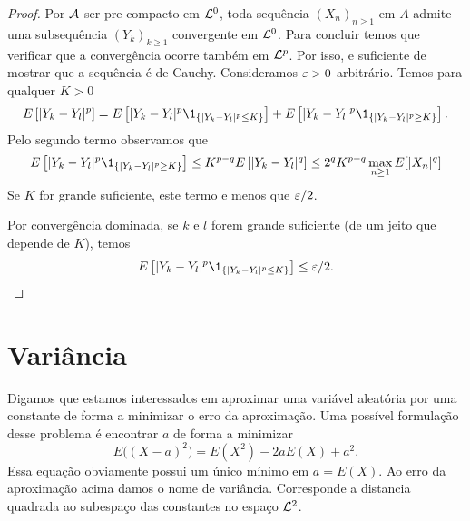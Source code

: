 \begin{topics}
 \begin{proof}
Por ${\mathcal A}$ ser pre-compacto em ${\mathcal L}^0$, toda sequência $(X_n)_{n\ge 1}$ em $A$ admite uma subsequência  $(Y_k)_{k\ge 1}$ convergente em ${\mathcal L}^0$.
Para concluir temos que verificar que a convergência ocorre também em ${\mathcal L}^p$. Por isso, e suficiente de mostrar que a sequência é de Cauchy.
Consideramos $\varepsilon>0$ arbitrário.
Temos para qualquer $K>0$
\begin{equation}
E\left[ |Y_k-Y_l |^p \right] = E\left[ |Y_k-Y_l|^p \1_{\{|Y_k-Y_l |^p \le K\}} \right] +
E\left[ |Y_k-Y_l |^p \1_{\{|Y_k-Y_l |^p \ge K\}} \right].
\end{equation}
 Pelo segundo termo observamos que
 \begin{equation}
 E\left[ |Y_k-Y_l|^p \1_{\{|Y_k-Y_l|^p \ge K\}} \right]\le K^{p-q} E\left[ |Y_k-Y_l|^q \right]\le 2^q K^{p-q} \max_{n\ge 1} E[|X_n|^q]
 \end{equation}
 Se $K$ for grande suficiente, este termo e menos que $\varepsilon/2$.

Por convergência dominada, se $k$ e $l$ forem grande suficiente (de um jeito que depende de $K$), temos
\begin{equation}
 E\left[ |Y_k-Y_l|^p \1_{\{|Y_k-Y_l|^p \le K\}} \right]\le \gep/2.
 \end{equation}

 \end{proof}


\end{topics}







\section{Variância}

Digamos que estamos interessados em aproximar uma variável aleatória por uma constante de forma a minimizar o erro da aproximação.
Uma possível formulação desse problema é encontrar $a$ de forma a minimizar
\begin{equation}
  \label{e:EX_aproxima}
  E\Big( (X - a)^2 \Big) = E(X^2) - 2 a E(X) + a^2.
\end{equation}
Essa equação obviamente possui um único mínimo em $a = E(X)$.
Ao erro da aproximação acima damos o nome de variância.
Corresponde a distancia quadrada ao subespaço das constantes no espaço ${\mathcal L}^2$.

